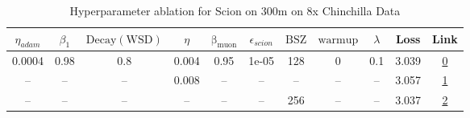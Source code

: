 \begin{table}[H]
\centering
\caption{Hyperparameter ablation for Scion on 300m on 8x Chinchilla Data}
\label{tab:ablation_scion_300m_8}
\begin{tabular}{ccccccccccc}
\toprule
$\eta_{adam}$ & $\beta_1$ & $\mathrm{Decay (WSD)}$ & $\eta$ & $\mathrm{\beta_{muon}}$ & $\epsilon_{scion}$ & $\mathrm{BSZ}$ & $\mathrm{warmup}$ & $\lambda$ & Loss & Link \\
\midrule
0.0004 & 0.98 & 0.8 & 0.004 & 0.95 & 1e-05 & 128 & 0 & 0.1 & 3.039 & \href{https://wandb.ai/stanford-mercury/optimizer-scaling/runs/sweep-300m-48B-scion0ebd9blr0.004-wd0.1-minlr0-warmup0-b10.98-gn-c7b0e6}{0} \\
\midrule
-- & -- & -- & 0.008 & -- & -- & -- & -- & -- & 3.057 & \href{https://wandb.ai/stanford-mercury/optimizer-scaling/runs/sweep-300m-48B-scion60ecb7lr0.008-wd0.1-minlr0-warmup0-b10.98-gn-da458a}{1} \\
-- & -- & -- & -- & -- & -- & 256 & -- & -- & 3.037 & \href{https://wandb.ai/stanford-mercury/optimizer-scaling/runs/sweep-300m-48B-scione51587lr0.004-wd0.1-minlr0-warmup0-b10.98-gn-55b3ad}{2} \\
\bottomrule
\end{tabular}
\end{table}

